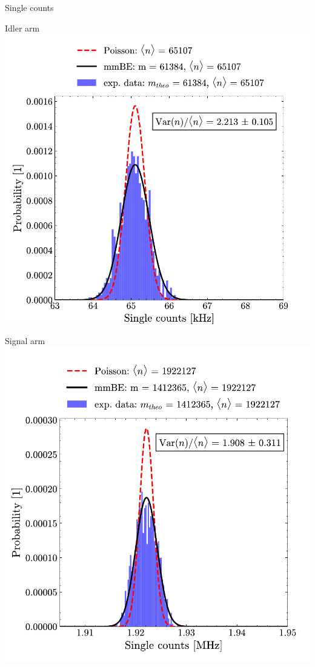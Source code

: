 \documentclass[10pt,aspectratio=43]{beamer}
\begin{document}
	\begin{frame}{Single counts}
		\begin{minipage}{.45\textwidth}
			\centering
			Idler arm
			\vspace{2em}
			\includegraphics[width=\textwidth]{Images/SingleStatisticsIdler_4.pdf}
		\end{minipage}
		\hfill
		\begin{minipage}{.45\textwidth}
			\centering
			Signal arm
			\vspace{2em}
			\includegraphics[width=\textwidth]{Images/SingleStatisticsSignal_4.pdf}
		\end{minipage}
	\end{frame}
	
\end{document}
